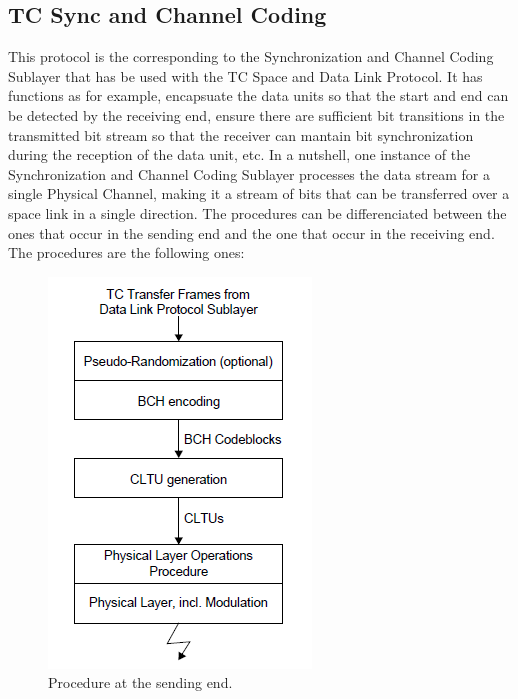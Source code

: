 \subsection{TC Sync and Channel Coding}
This protocol is the corresponding to the Synchronization and Channel Coding Sublayer that has be used with the TC Space and Data Link Protocol. It has functions as for example, encapsuate the data units so that the start and end can be detected by the receiving end, ensure there are sufficient bit transitions in the transmitted bit stream so that the receiver can mantain bit synchronization during the reception of the data unit, etc. In a nutshell, one instance of the Synchronization and Channel Coding Sublayer processes the data stream for a single Physical Channel, making it a stream of bits that can be transferred over a space link in a single direction. The procedures can be differenciated between the ones that occur in the sending end and the one that occur in the receiving end. The procedures are the following ones: 
\begin{figure}[H]
\begin{center}
\includegraphics[scale=1]{Proceduressendingend.PNG}    
\caption{Procedure at the sending end.}
\end{center}
\end{figure}
